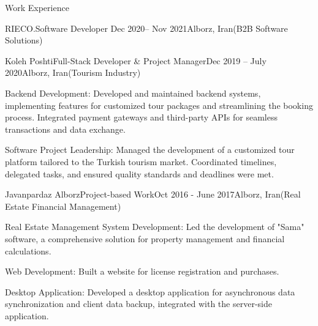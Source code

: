 \documentclass[]{kyvernitis-resume}
\begin{document}
\begin{section}{Work Experience}
\begin{subsection}{RIECO.}{Software Developer }{Dec 2020-- Nov 2021}{Alborz, Iran}{(B2B Software Solutions)}
    \end{subsection}
    
    \begin{subsection}{Koleh Poshti}{Full-Stack Developer \& Project Manager}{Dec 2019 -- July 2020}{Alborz, Iran}{(Tourism Industry)}

        	\item Backend Development: Developed and maintained backend systems, implementing features for customized tour packages and streamlining the booking process. Integrated payment gateways and third-party APIs for seamless transactions and data exchange.
        	\item Software Project Leadership: Managed the development of a customized tour platform tailored to the Turkish tourism market. Coordinated timelines, delegated tasks, and ensured quality standards and deadlines were met.
    \end{subsection}


    \begin{subsection}{Javanpardaz Alborz}{Project-based Work}{Oct 2016 - June 2017}{Alborz, Iran}{(Real Estate Financial Management)}
	\item Real Estate Management System Development: Led the development of "Sama" software, a comprehensive solution for property management and financial calculations.
	\item Web Development: Built a 
website for license registration and purchases.
	\item Desktop Application: Developed a 
desktop application for asynchronous data synchronization and client data backup, integrated with the server-side application.

    \end{subsection}



\end{section}
\end{document}
